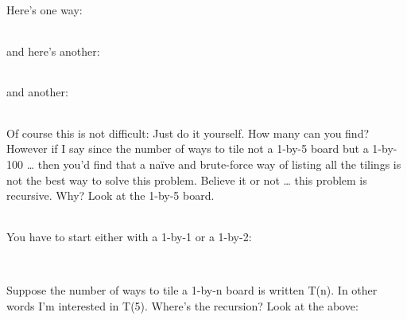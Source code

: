 \documentclass[
]{article}
\begin{document}
Here's one way:

\begin{longtable}[]{@{}lllll@{}}
\toprule
\endhead
& & & &\tabularnewline
\bottomrule
\end{longtable}

and here's another:

\begin{longtable}[]{@{}lllll@{}}
\toprule
\endhead
& & & &\tabularnewline
\bottomrule
\end{longtable}

and another:

\begin{longtable}[]{@{}lllll@{}}
\toprule
\endhead
& & & &\tabularnewline
\bottomrule
\end{longtable}

Of course this is not difficult: Just do it yourself. How many can you
find? However if I say since the number of ways to tile not a 1-by-5
board but a 1-by-100 \ldots{} then you'd find that a naïve and
brute-force way of listing all the tilings is not the best way to solve
this problem. Believe it or not \ldots{} this problem is recursive. Why?
Look at the 1-by-5 board.

\begin{longtable}[]{@{}lllll@{}}
\toprule
\endhead
& & & &\tabularnewline
\bottomrule
\end{longtable}

You have to start either with a 1-by-1 or a 1-by-2:

\begin{longtable}[]{@{}lllll@{}}
\toprule
\endhead
& & & &\tabularnewline
\bottomrule
\end{longtable}

\begin{longtable}[]{@{}lllll@{}}
\toprule
\endhead
& & & &\tabularnewline
\bottomrule
\end{longtable}

Suppose the number of ways to tile a 1-by-n board is written T(n). In
other words I'm interested in T(5). Where's the recursion? Look at the
above:

\begin{longtable}[]{@{}lllll@{}}
\toprule
\endhead
& & & &\tabularnewline
\bottomrule
\end{longtable}

\begin{longtable}[]{@{}lllll@{}}
\toprule
\endhead
& & & &\tabularnewline
\bottomrule
\end{longtable}
\end{document}
